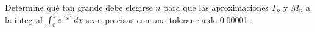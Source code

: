 \item Determine qué tan grande debe elegirse $n$ para que las aproximaciones $T_n$ y $M_n$ a la integral $\int_{0}^{1} e^{-x^2} \, dx$ sean precisas con una tolerancia de 0.00001.
